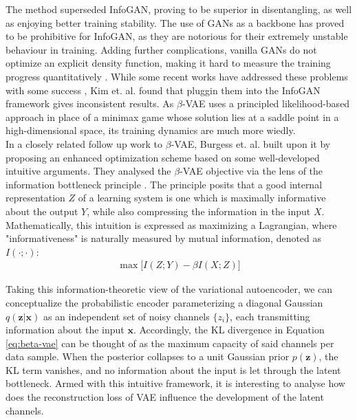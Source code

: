 \documentclass{report}
\begin{document}
\bigskip
\noindent The method superseded InfoGAN, proving to be superior in disentangling, as well as enjoying better training stability. The use of GANs as a backbone has proved to be prohibitive for InfoGAN, as they are notorious for their extremely unstable behaviour in training. Adding further complications, vanilla GANs do not optimize an explicit density function, making it hard to measure the training progress quantitatively \cite{gan-tutorial}. While some recent works have addressed these problems with some success \cite{wgan, wgan-gp, began}, Kim et. al. \cite{factor-vae} found that pluggin them into the InfoGAN framework gives inconsistent results. As $\beta$-VAE uses a principled likelihood-based approach in place of a minimax game whose solution lies at a saddle point in a high-dimensional space, its training dynamics are much more wiedly. \\

\noindent In a closely related follow up work to $\beta$-VAE, Burgess et. al. \cite{understanding-beta-vae} built upon it by proposing an enhanced optimization scheme based on some well-developed intuitive arguments. They analysed the $\beta$-VAE objective via the lens of the information bottleneck principle \cite{tishby-ib}. The principle posits that a good internal representation $Z$ of a learning system is one which is maximally informative about the output $Y$, while also compressing the information in the input $X$. Mathematically, this intuition is expressed as maximizing a Lagrangian, where "informativeness" is naturally measured by mutual information, denoted as $I(\cdot; \cdot)$:
\begin{equation}
\begin{gathered}
\max \big[ I(Z; Y) - \beta I(X;Z) \big]
\end{gathered}
\label{eq:ib}
\end{equation}

\bigskip

\noindent Taking this information-theoretic view of the variational autoencoder, we can conceptualize the probabilistic encoder parameterizing a diagonal Gaussian $q(\boldsymbol{z}|\boldsymbol{x})$ as an independent set of noisy channels $\{z_i\}$, each transmitting information about the input $\boldsymbol{x}$. Accordingly, the KL divergence in Equation \ref{eq:beta-vae} can be thought of as the maximum capacity of said channels per data sample. When the posterior collapses to a unit Gaussian prior $p(\boldsymbol{z})$, the KL term vanishes, and no information about the input is let through the latent bottleneck. Armed with this intuitive framework, it is interesting to analyse how does the reconstruction loss of VAE influence the development of the latent channels. \\
\end{document}

